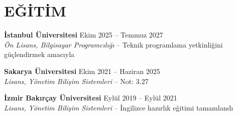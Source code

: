 \documentclass[a4paper,8pt]{article}
\begin{document}
\section{EĞİTİM}

\textbf{İstanbul Üniversitesi} \hfill {\small Ekim 2025 -- Temmuz 2027}\\
{\small \textit{Ön Lisans, Bilgisayar Programcılığı} -- Teknik programlama yetkinliğini güçlendirmek amacıyla}

\vspace{3pt}

\textbf{Sakarya Üniversitesi} \hfill {\small Ekim 2021 -- Haziran 2025}\\
{\small \textit{Lisans, Yönetim Bilişim Sistemleri} -- Not: 3.27}

\vspace{3pt}

\textbf{İzmir Bakırçay Üniversitesi} \hfill {\small Eylül 2019 -- Eylül 2021}\\
{\small \textit{Lisans, Yönetim Bilişim Sistemleri} -- İngilizce hazırlık eğitimi tamamlandı}

\end{document}
